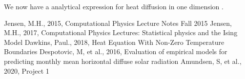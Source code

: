 \documentclass{article}
\begin{document}
We now have a analytical expression for heat diffusion in one dimension \cite{94}\cite{96}. 

\clearpage

\begin{thebibliography}{9}
	Jensen, M.H., 2015, Computational Physics Lecture Notes Fall 2015
	Jensen, M.H., 2017, Computational Physics Lectures: Statistical physics and the Ising Model
	Dawkins, Paul., 2018, Heat Equation With Non-Zero Temperature Boundaries
	Despotovic, M, et al., 2016, Evaluation of empirical models for predicting monthly mean horizontal diffuse solar radiation
	Amundsen, S, et al., 2020, Project 1
	
\end{thebibliography}
\end{document}
